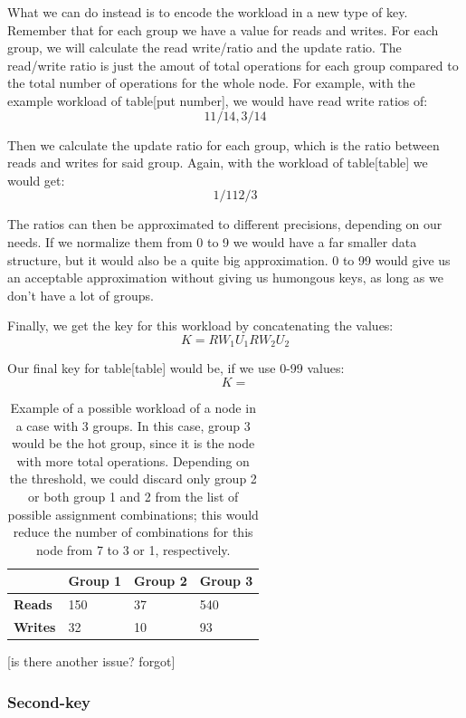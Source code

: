 What we can do instead is to encode the workload in a new type of key. Remember that for each group we have a value for reads and writes. For each group, we will calculate the read write/ratio and the update ratio. The read/write ratio is just the amout of total operations for each group compared to the total number of operations for the whole node. For example, with the example workload of table[put number], we would have read write ratios of:
$$ 11/14, 3/14 $$

Then we calculate the update ratio for each group, which is the ratio between reads and writes for said group. Again, with the workload of table[table] we would get:
$$1/11 2/3 $$

The ratios can then be approximated to different precisions, depending on our needs. If we normalize them from 0 to 9 we would have a far smaller data structure, but it would also be a quite big approximation. 0 to 99 would give us an acceptable approximation without giving us humongous keys, as long as we don't have a lot of groups. 

Finally, we get the key for this workload by concatenating the values:
$$ K = RW_1 U_1 RW_2 U_2 $$

Our final key for table[table] would be, if we use 0-99 values:
$$ K = $$

\begin{table}[htb]
  \centering
  \begin{tabular}{l l l l}
    \hline
    & \textbf{Group 1} & \textbf{Group 2} & \textbf{Group 3} \\
    \hline
    \textbf{Reads} & 150 & 37 & 540 \\
    \textbf{Writes} & 32 & 10 & 93 \\
    \hline
  \end{tabular}
  \caption{Example of a possible workload of a node in a case with 3 groups. In this case, group 3 would be the hot group, since it is the node with more total operations. Depending on the threshold, we could discard only group 2 or both group 1 and 2 from the list of possible assignment combinations; this would reduce the number of combinations for this node from 7 to 3 or 1, respectively.}\label{tab:workload-example}
\end{table}


[is there another issue? forgot]

\subsubsection{Second-key}\label{sec:second-key}

